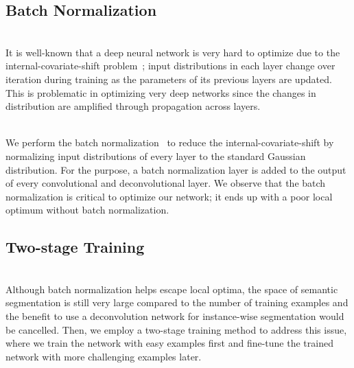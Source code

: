 \documentclass[10pt,twocolumn,letterpaper]{article}
\begin{document}
\subsection{Batch Normalization}
\iffalse
Note that SDN is very deep network (almost twice deeper than the deep classification network vgg-16 \cite{Vgg16}). 
It is well-known that deep neural network is very hard to optimize due to problems like covariate-shift. 
Therefore, state-of-the-art classification networks used to utilize layer-wise pretraining ~\cite{Vgg16} or multiple classification layer connected to multiple different layer ~\cite{Googlenet}.

We utilize Batch-Normalization which tackle the covariate-shift problem of very deep neural network model. 
For training, we attach batch-normalization after every convolution layer, including convolution layers originally contained in vgg-16 network. 
As shown in Fig. 4 batch-normalization was critical factor for optimization of our network. 
Without batch-normalization, the network end up stuck in the state of very low accuracy and further training was not available 
\fi

\ifdefined{} \\ \fi
It is well-known that a deep neural network is very hard to optimize due to the internal-covariate-shift problem~\cite{LOFFEARXIV15}; input distributions in each layer change over iteration during training as the parameters of its previous layers are updated.
This is problematic in optimizing very deep networks since the changes in distribution are amplified through propagation across layers.




\ifdefined{} \\ \fi
We perform the batch normalization~\cite{LOFFEARXIV15} to reduce the internal-covariate-shift by normalizing input distributions of every layer to the standard Gaussian distribution.
For the purpose, a batch normalization layer is added to the output of every convolutional and deconvolutional layer.
We observe that the batch normalization is critical to optimize our network; it ends up with a poor local optimum without batch normalization.

\subsection{Two-stage Training}
\ifdefined{} \\ \fi
Although batch normalization helps escape local optima, the space of semantic segmentation is still very large compared to the number of training examples and the benefit to use a deconvolution network for instance-wise segmentation would be cancelled. 
Then, we employ a two-stage training method to address this issue, where we train the network with easy examples first and fine-tune the trained network with more challenging examples later.
\end{document}
